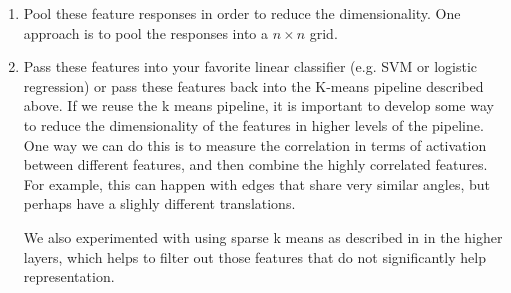 \documentclass{article} %
\begin{document}
\begin{enumerate}
\item Pool these feature responses in order to reduce the dimensionality. One approach is to pool the responses into a $n \times n$ grid.

\item Pass these features into your favorite linear classifier (e.g. SVM or logistic regression) or pass these features back into the K-means pipeline described above. If we reuse the k means pipeline, it is important to develop some way to reduce the dimensionality of the features in higher levels of the pipeline. One way we can do this is to measure the correlation in terms of activation between different features, and then combine the highly correlated features. For example, this can happen with edges that share very similar angles, but perhaps have a slighly different translations.

  We also experimented with using sparse k means as described in \cite{tibs10} in the higher layers, which helps to filter out those features that do not significantly help representation.
\end{enumerate}
\end{document}
